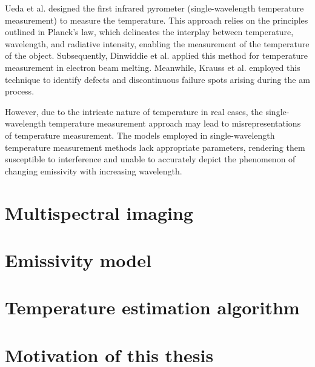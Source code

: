 Ueda et al. designed the first infrared pyrometer (single-wavelength temperature 
measurement) to measure the temperature. This approach relies on the principles outlined in 
Planck's law, which delineates the interplay between temperature, 
wavelength, and radiative intensity, enabling the measurement of the 
temperature of the object\cite{Ueda.1986}. Subsequently, Dinwiddie et al. 
applied this method for temperature measurement in electron beam melting\cite{Dinwiddie.2014}. 
Meanwhile, Krauss et al. employed this technique to identify defects 
and discontinuous failure spots arising during the \gls{am} process\cite{Krauss.2012}.


However, due to the intricate nature of temperature in real cases, the 
single-wavelength temperature measurement approach may lead to 
misrepresentations of temperature measurement. The models employed in 
single-wavelength temperature measurement methods lack appropriate 
parameters, rendering them susceptible to interference and unable to 
accurately depict the phenomenon of changing emissivity with 
increasing wavelength\cite{Raplee.2017}.





%
%
\section{Multispectral imaging}%

%
%
\section{Emissivity model}%

%
%
\section{Temperature estimation algorithm}


\section{Motivation of this thesis}